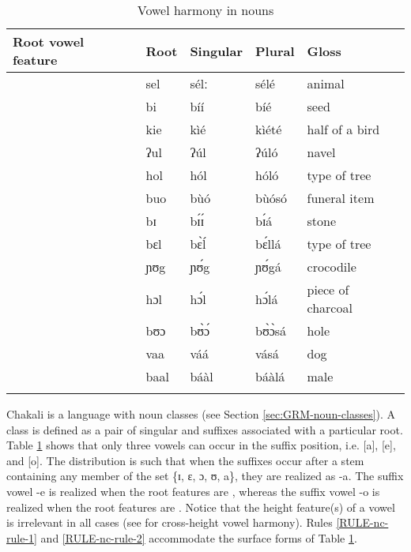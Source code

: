 \begin{table}


\caption{Vowel harmony in nouns\label{tab:examples-harmony}}
 \begin{tabular}{lllll}
\lsptoprule
Root vowel feature & Root &  Singular & Plural & Gloss\\ \midrule

{\sc [+atr, --hi, --lo, --ro]} &sel& sélː&sélé & animal\\
{\sc [+atr, +hi, --lo, --ro]} &bi &bíí &bíé& seed \\
{\sc [+atr, --lo, --ro]} &kie&  kìé 	&kìété	&half of a bird\\
{\sc [+atr, +hi, --lo, +ro]} &ʔul & ʔúl 	& ʔúló 	 
 & 	navel\\
{\sc [+atr, --hi, --lo, +ro]} &hol& hól & hóló & type of tree   \\
{\sc [+atr, --lo, +ro]} &buo& bùó 	& bùósó  &	funeral item\\
{\sc [--atr, +hi, --ro]} &bɪ& bɪ́ɪ́	&	bɪ́á 		&	stone\\
{\sc [--atr,  --hi, --lo, --ro]} &bɛl & bɛ̀ĺ &bɛ́llá & type of tree \\
{\sc [--atr, +hi, --lo, +ro]} & ɲʊg& ɲʊ́g & ɲʊ́gá & crocodile \\
{\sc [--atr,  --hi, --lo, +ro]} & hɔl& hɔ́l & hɔ́lá & piece of charcoal  \\
{\sc [--atr, --lo, +ro]} & bʊɔ& bʊ̀ɔ́	& bʊ̀ɔ̀sá	  &	hole\\
{\sc [--atr, +lo]} &vaa& váá  & vásá & dog \\
{\sc  [--atr, +lo]} &baal& báàl& báàlá& male \\

  \lspbottomrule
 \end{tabular}

\end{table}  

 Chakali is a language with noun classes (see Section \ref{sec:GRM-noun-classes}). A class is defined as a pair of singular and  suffixes associated with
a particular root. Table \ref{tab:examples-harmony} shows that only three vowels can occur in the  suffix position, i.e. [a],  [e],  and [o]. The distribution is such that  when the suffixes occur after a stem containing any member of the set \{ɪ, ɛ, ɔ, ʊ, a\},  they are realized as {\sls -a}.  The  suffix vowel {\sls -e} is realized when the root 
features are {\sc [+atr, --ro]}, whereas the  suffix vowel {\sls -o} is realized when 
the root features are {\sc [+atr, +ro]}.  Notice that the height feature(s) of a
vowel is irrelevant in all cases (see \cite{Stew79} for cross-height vowel harmony).  Rules 
\ref{RULE-nc-rule-1} and \ref{RULE-nc-rule-2} accommodate the surface forms of Table
\ref{tab:examples-harmony}.


